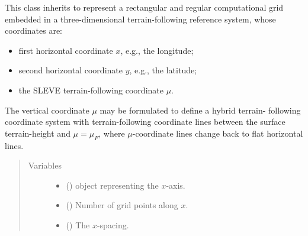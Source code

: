 \documentclass[letterpaper,10pt,english]{sphinxmanual}
\begin{document}
\begin{fulllineitems}
\label{\detokenize{api:grids.sleve.SLEVE3d}}
This class inherits {\hyperref[\detokenize{api:grids.xyz_grid.XYZGrid}]{}} to represent a rectangular and regular
computational grid embedded in a three-dimensional terrain-following reference system, whose
coordinates are:
\begin{itemize}
\item {} 
first horizontal coordinate \(x\), e.g., the longitude;

\item {} 
second horizontal coordinate \(y\), e.g., the latitude;

\item {} 
the SLEVE terrain-following coordinate \(\mu\).

\end{itemize}

The vertical coordinate \(\mu\) may be formulated to define a hybrid terrain-
following coordinate system with terrain-following coordinate lines between the
surface terrain-height and \(\mu = \mu_F\), where \(\mu\)-coordinate
lines change back to flat horizontal lines.
\begin{quote}\begin{description}
\item[{Variables}] \leavevmode\begin{itemize}
\item {} 
{\hyperref[\detokenize{api:grids.xyz_grid.XYZGrid.x}]{}} () \textendash{} {\hyperref[\detokenize{api:grids.axis.Axis}]{}} object representing the \(x\)-axis.

\item {} 
{\hyperref[\detokenize{api:grids.xyz_grid.XYZGrid.nx}]{}} () \textendash{} Number of grid points along \(x\).

\item {} 
{\hyperref[\detokenize{api:grids.xyz_grid.XYZGrid.dx}]{}} () \textendash{} The \(x\)-spacing.


\end{itemize}
\end{description}
\end{quote}
\end{fulllineitems}
\end{document}
